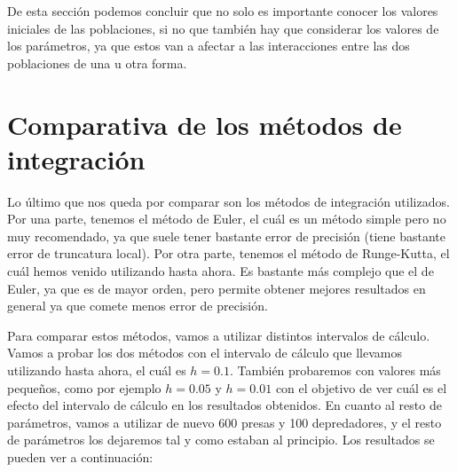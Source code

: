 \documentclass[11pt,a4paper]{article}
\begin{document}
De esta sección podemos concluir que no solo es importante conocer los valores iniciales de las
poblaciones, si no que también hay que considerar los valores de los parámetros, ya que estos van
a afectar a las interacciones entre las dos poblaciones de una u otra forma.

\section{Comparativa de los métodos de integración}

Lo último que nos queda por comparar son los métodos de integración utilizados. Por una parte,
tenemos el método de Euler, el cuál es un método simple pero no muy recomendado,
ya que suele tener bastante error de precisión (tiene bastante error de truncatura local).
Por otra parte, tenemos el método de Runge-Kutta, el cuál hemos venido utilizando
hasta ahora. Es bastante más complejo que el de Euler, ya que es de mayor orden,
pero permite obtener mejores resultados en general ya que comete menos error de
precisión.

Para comparar estos métodos, vamos a utilizar distintos intervalos de cálculo. Vamos a
probar los dos métodos con el intervalo de cálculo que llevamos utilizando hasta
ahora, el cuál es $h = 0.1$. También probaremos con valores más pequeños, como
por ejemplo $h = 0.05$ y $h = 0.01$ con el objetivo de ver cuál es el efecto del
intervalo de cálculo en los resultados obtenidos. En cuanto al resto de parámetros, vamos
a utilizar de nuevo 600 presas y 100 depredadores, y el resto de parámetros los dejaremos
tal y como estaban al principio. Los resultados se pueden ver a continuación:
\end{document}
